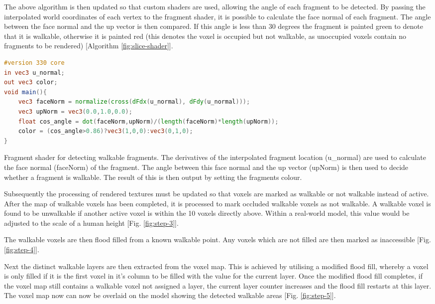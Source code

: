      The above algorithm is then updated so that custom shaders are used, allowing the angle of each fragment to be detected. By passing the interpolated world coordinates of each vertex to the fragment shader, it is possible to calculate the face normal of each fragment. The angle between the face normal and the up vector is then compared. If this angle is less than 30 degrees the fragment is painted green to denote that it is walkable, otherwise it is painted red (this denotes the voxel is occupied but not walkable, as unoccupied voxels contain no fragments to be rendered) [Algorithm \ref{fig:slice-shader}].

\begin{algorithm}
\begin{lstlisting}[language=GLSL]
#version 330 core
in vec3 u_normal;
out vec3 color;
void main(){
	vec3 faceNorm = normalize(cross(dFdx(u_normal), dFdy(u_normal)));
	vec3 upNorm = vec3(0.0,1.0,0.0);
	float cos_angle = dot(faceNorm,upNorm)/(length(faceNorm)*length(upNorm));
	color = (cos_angle>0.86)?vec3(1,0,0):vec3(0,1,0);
}
\end{lstlisting}
\protect\caption[Fragment shader for detecting walkable fragments.]{\label{fig:slice-shader}Fragment shader for detecting walkable fragments. The derivatives of the interpolated fragment location (u_normal) are used to calculate the face normal (faceNorm) of the fragment. The angle between this face normal and the up vector (upNorm) is then used to decide whether a fragment is walkable. The result of this is then output by setting the fragments colour.}
\end{algorithm}

      Subsequently the processing of rendered textures must be updated so that voxels are marked as walkable or not walkable instead of active. After the map of walkable voxels has been completed, it is processed to mark occluded walkable voxels as not walkable. A walkable voxel is found to be unwalkable if another active voxel is within the 10 voxels directly above. Within a real-world model, this value would be adjusted to the scale of a human height [Fig. \ref{fig:step-3}].

      The walkable voxels are then flood filled from a known walkable point. Any voxels which are not filled are then marked as inaccessible [Fig. \ref{fig:step-4}].
      
      Next the distinct walkable layers are then extracted from the voxel map. This is achieved by utilising a modified flood fill, whereby a voxel is only filled if it is the first voxel in it's column to be filled with the value for the current layer. Once the modified flood fill completes, if the voxel map still contains a walkable voxel not assigned a layer, the current layer counter increases and the flood fill restarts at this layer. The voxel map now can now be overlaid on the model showing the detected walkable areas [Fig. \ref{fig:step-5}].

